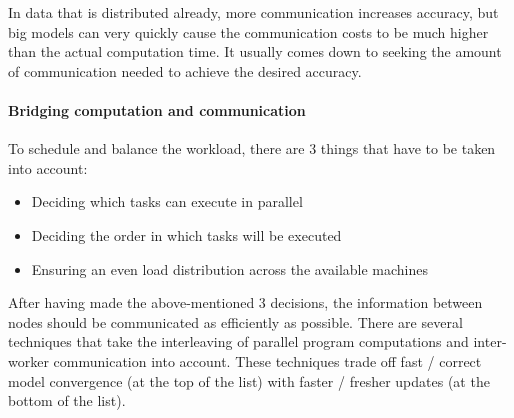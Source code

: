 In data that is distributed already, more communication increases accuracy, but big models can very quickly cause the communication costs to be much higher than the actual computation time. It usually comes down to seeking the amount of communication needed to achieve the desired accuracy.


\paragraph{Bridging computation and communication}
To schedule and balance the workload, there are 3 things that have to be taken into account:\cite{Xing16}\\
\begin{itemize}
	\item Deciding which tasks can execute in parallel
	\item Deciding the order in which tasks will be executed
	\item Ensuring an even load distribution across the available machines
\end{itemize}
After having made the above-mentioned 3 decisions, the information between nodes should be communicated as efficiently as possible. There are several techniques that take the interleaving of parallel program computations and inter-worker communication into account. These techniques trade off fast / correct model convergence (at the top of the list) with faster / fresher updates (at the bottom of the list).
